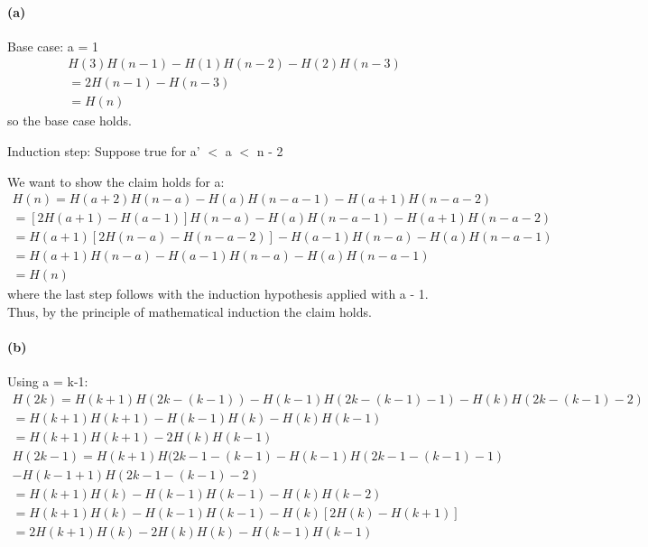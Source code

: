 \documentclass[11pt,a4paper]{article}
\begin{document}
\paragraph*{(a)}

Base case: a = 1
\begin{equation}
	\begin{aligned}
H(3)H(n-1) - H(1)H(n-2) - H(2)H(n-3) \\
= 2H(n-1) - H(n-3) \\
= H(n)
	\end{aligned}
\end{equation}
so the base case holds.

Induction step: Suppose true for a' $<$ a $<$ n - 2

We want to show the claim holds for a:
\begin{equation}
	\begin{aligned} 
	H(n) = H(a+2)H(n-a) - H(a)H(n-a-1) - H(a+1)H(n-a-2) \\ = [2H(a+1) - H(a-1)]H(n-a) - H(a)H(n-a-1) - H(a+1)H(n-a-2)
	\\ = H(a+1)[2H(n-a) - H(n-a-2)] - H(a-1)H(n-a) - H(a)H(n-a-1)
	\\ = H(a+1)H(n-a) - H(a-1)H(n-a) - H(a)H(n-a-1)
	\\ = H(n)
	\end{aligned}
\end{equation}
where the last step follows with the induction hypothesis applied with a - 1.
Thus, by the principle of mathematical induction the claim holds. 

\paragraph*{(b)}
Using a = k-1:
\begin{equation}
	\begin{aligned}
	H(2k) = H(k+1)H(2k-(k-1)) - H(k-1)H(2k-(k-1)-1) - H(k)H(2k-(k-1)-2) 
 \\= H(k+1)H(k+1) - H(k-1)H(k) - H(k)H(k-1) 
 \\= H(k+1)H(k+1) - 2H(k)H(k-1)
 	\end{aligned}
\end{equation}
\begin{equation}
	\begin{aligned}
	H(2k-1) = H(k+1)H(2k-1-(k-1) - H(k-1)H(2k-1-(k-1)-1) \\
	- H(k-1+1)H(2k-1-(k-1)-2)
	\\= H(k+1)H(k) - H(k-1)H(k-1) - H(k)H(k-2)
	\\= H(k+1)H(k) - H(k-1)H(k-1) - H(k)[2H(k) - H(k+1)]
	\\=2H(k+1)H(k) - 2H(k)H(k) - H(k-1)H(k-1)
 	\end{aligned}
\end{equation}
\end{document}

